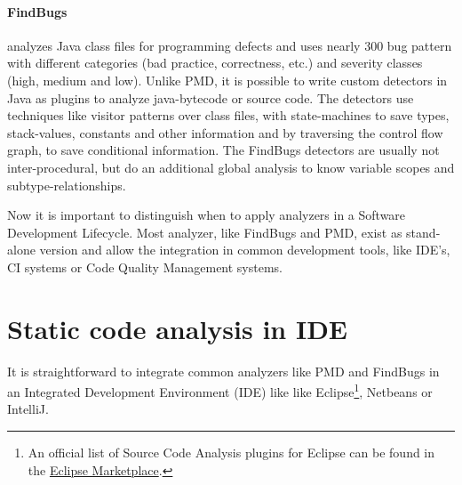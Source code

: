 \documentclass[conference]{IEEEtran}
\begin{document}
\paragraph{FindBugs}
analyzes Java class files for programming defects and uses nearly 300 bug pattern with different categories (bad practice, correctness, etc.) and severity classes (high, medium and low)\cite{Findbugs}.
Unlike PMD, it is possible to write custom detectors in Java as plugins to analyze java-bytecode or source code.
The detectors use techniques like visitor patterns over class files, with state-machines to save types, stack-values, constants and other information and by traversing the control flow graph, to save conditional information.
The FindBugs detectors are usually not inter-procedural, but do an additional global analysis to know variable scopes and subtype-relationships.


Now it is important to distinguish when to apply analyzers in a Software Development Lifecycle.
Most analyzer, like FindBugs and PMD, exist as stand-alone version and allow the integration in common development tools, like IDE's, CI systems or Code Quality Management systems.







\section{Static code analysis in IDE}
\label{sec:static_code_analysis_ide}
It is straightforward to integrate common analyzers like PMD and FindBugs in an Integrated Development Environment (IDE) like like Eclipse\footnote{An official list of Source Code Analysis plugins for Eclipse can be found in the \href{http://marketplace.eclipse.org/taxonomy/term/14,31}{Eclipse Marketplace}.}, Netbeans or IntelliJ.
\end{document}
